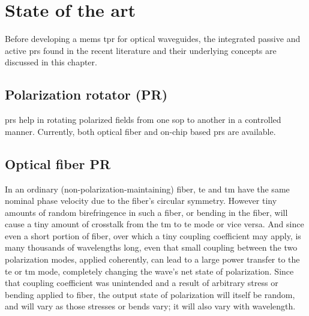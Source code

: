 \documentclass[../report.tex]{subfiles}
\begin{document}
	
	
\chapter{State of the art}
Before developing a \gls{mems} \gls{tpr} for optical waveguides, the integrated passive and active \gls{pr}s found in the recent literature and their underlying concepts are discussed in this chapter. 
			
	\section{Polarization rotator (PR)}	
\gls{pr}s help in rotating polarized fields from one \gls{sop} to another in a controlled manner. Currently, both optical fiber and on-chip based \gls{pr}s are available. 	

	\section{Optical fiber PR}	
In an ordinary (non-polarization-maintaining) fiber, \gls{te} and \gls{tm} have the same nominal phase velocity due to the fiber's circular symmetry. However tiny amounts of random birefringence in such a fiber, or bending in the fiber, will cause a tiny amount of crosstalk from the \gls{tm} to \gls{te} mode or vice versa. And since even a short portion of fiber, over which a tiny coupling coefficient may apply, is many thousands of wavelengths long, even that small coupling between the two polarization modes, applied coherently, can lead to a large power transfer to the \gls{te} or \gls{tm} mode, completely changing the wave's net state of polarization. Since that coupling coefficient was unintended and a result of arbitrary stress or bending applied to fiber, the output state of polarization will itself be random, and will vary as those stresses or bends vary; it will also vary with wavelength.\par
\end{document}
